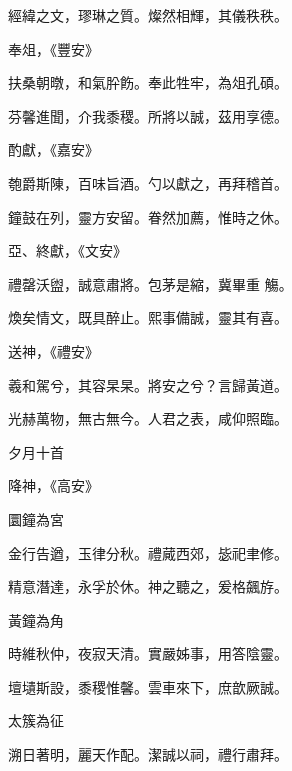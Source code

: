 \begin{pinyinscope}
 經緯之文，璆琳之質。燦然相輝，其儀秩秩。



 奉俎，《豐安》



 扶桑朝暾，和氣肸飭。奉此牲牢，為俎孔碩。



 芬馨進聞，介我黍稷。所將以誠，茲用享德。



 酌獻，《嘉安》



 匏爵斯陳，百味旨酒。勺以獻之，再拜稽首。



 鐘鼓在列，靈方安留。眷然加薦，惟時之休。



 亞、終獻，《文安》



 禮罄沃盥，誠意肅將。包茅是縮，冀畢重
 觴。



 煥矣情文，既具醉止。熙事備誠，靈其有喜。



 送神，《禮安》



 羲和駕兮，其容杲杲。將安之兮？言歸黃道。



 光赫萬物，無古無今。人君之表，咸仰照臨。



 夕月十首



 降神，《高安》



 圜鐘為宮



 金行告遒，玉律分秋。禮蕆西郊，毖祀聿修。



 精意潛達，永孚於休。神之聽之，爰格飆斿。



 黃鐘為角



 時維秋仲，夜寂天清。實嚴姊事，用答陰靈。



 壇壝斯設，黍稷惟馨。雲車來下，庶歆厥誠。



 太簇為征



 溯日著明，麗天作配。潔誠以祠，禮行肅拜。




\end{pinyinscope}
